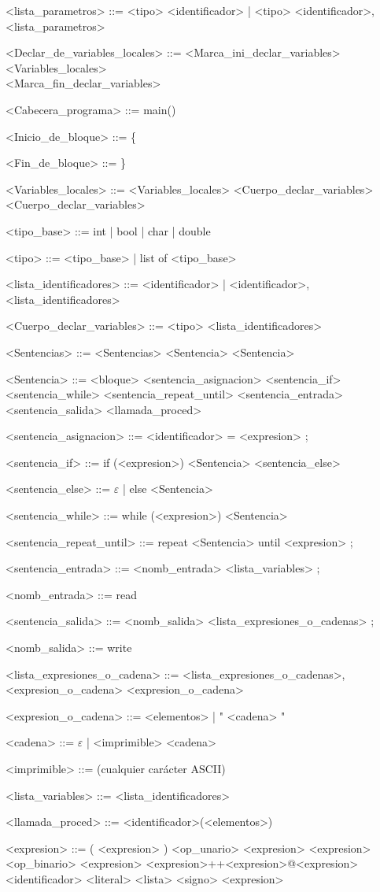 \documentclass{scrartcl}
\begin{document}
\begin{grammar}
<lista_parametros> ::= <tipo> <identificador> | <tipo> <identificador>, <lista_parametros>

<Declar_de_variables_locales> ::= <Marca_ini_declar_variables> \\
<Variables_locales> \\
<Marca_fin_declar_variables>

<Cabecera_programa> ::= main()

<Inicio_de_bloque> ::= \{

<Fin_de_bloque> ::= \}

<Variables_locales> ::= <Variables_locales> <Cuerpo_declar_variables>
\alt <Cuerpo_declar_variables>

<tipo_base> ::= int | bool | char | double

<tipo> ::= <tipo_base> | list of <tipo_base>

<lista_identificadores> ::= <identificador> | <identificador>, <lista_identificadores>

<Cuerpo_declar_variables> ::= <tipo> <lista_identificadores>

<Sentencias> ::= <Sentencias> <Sentencia>
\alt <Sentencia>

<Sentencia> ::= <bloque>
\alt <sentencia_asignacion>
\alt <sentencia_if>
\alt <sentencia_while>
\alt <sentencia_repeat_until>
\alt <sentencia_entrada>
\alt <sentencia_salida>
\alt <llamada_proced>

<sentencia_asignacion> ::=  <identificador> = <expresion> ;

<sentencia_if> ::= if (<expresion>) <Sentencia> <sentencia_else>

<sentencia_else> ::= $\varepsilon$ | else <Sentencia>

<sentencia_while> ::= while (<expresion>) <Sentencia>

<sentencia_repeat_until> ::= repeat <Sentencia> until <expresion> ;

<sentencia_entrada> ::= <nomb_entrada> <lista_variables> ;

<nomb_entrada> ::= read

<sentencia_salida> ::= <nomb_salida> <lista_expresiones_o_cadenas> ;

<nomb_salida> ::= write

<lista_expresiones_o_cadena> ::= <lista_expresiones_o_cadenas>, <expresion_o_cadena>
\alt <expresion_o_cadena>

<expresion_o_cadena> ::= <elementos> | " <cadena> "

<cadena> ::= $\varepsilon$ | <imprimible> <cadena>

<imprimible> ::= (cualquier carácter ASCII)

<lista_variables> ::= <lista_identificadores>

<llamada_proced> ::= <identificador>(<elementos>)

<expresion> ::= ( <expresion> )
\alt <op_unario> <expresion>
\alt <expresion> <op_binario> <expresion>
\alt <expresion>++<expresion>@<expresion>
\alt <identificador>
\alt <literal>
\alt <lista>
\alt <signo> <expresion>

\end{grammar}
\end{document}
